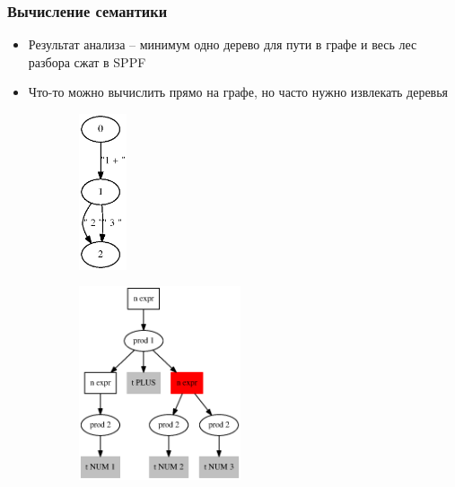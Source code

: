 \documentclass{beamer}
\begin{document}
\begin{frame}[fragile]
	\transwipe[direction=90]
	\frametitle{Вычисление семантики}
    \begin{itemize}
        \item Результат анализа -- минимум одно дерево для пути в графе и весь лес разбора сжат в SPPF
        \item Что-то можно вычислить прямо на графе, но часто нужно извлекать деревья
    \end{itemize}
    
    \begin{figure}[h]
        \begin{subfigure}[h]{0.33\textwidth}
            \includegraphics[width=40pt]{picts/before_tokenization.eps}
        \end{subfigure}
        \qquad \qquad
        \begin{subfigure}[h]{0.33\textwidth}
            \includegraphics[width=135pt]{picts/Calc_sppf.eps}
        \end{subfigure}
    \end{figure}
\end{frame}
\end{document}
